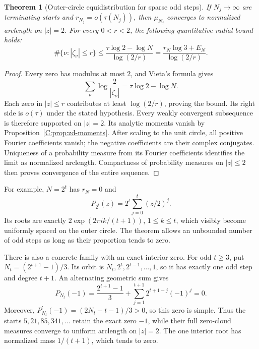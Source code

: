 \documentclass[11pt,a4paper]{article}
\newtheorem{theorem}{Theorem}[section]
\theoremstyle{definition}
\theoremstyle{remark}
\numberwithin{equation}{section}
\begin{document}
\begin{theorem}[Outer-circle equidistribution for sparse odd steps]
\label{C:thm:zd-outer-equidistribution}
If $N_j\to\infty$ are terminating starts and
$r_{N_j}=o(\tau(N_j))$, then $\mu_{N_j}$ converges to normalized
arclength on $|z|=2$.
For every $0<r<2$, the following quantitative radial bound holds:
\[
 \#\{\nu:|\zeta_\nu|\le r\}
 \le\frac{\tau\log2-\log N}{\log(2/r)}
 =\frac{r_N\log3+E_N}{\log(2/r)}.
\]
\end{theorem}
\begin{proof}
Every zero has modulus at most $2$, and Vieta's formula gives
\[
 \sum_\nu\log\frac2{|\zeta_\nu|}
 =\tau\log2-\log N.
\]
Each zero in $|z|\le r$ contributes at least $\log(2/r)$, proving
the bound. Its right side is $o(\tau)$ under the stated hypothesis.
Every weakly convergent subsequence is therefore supported on $|z|=2$.
Its analytic moments vanish by Proposition~\ref{C:prop:zd-moments}.
After scaling to the unit circle, all positive Fourier coefficients
vanish; the negative coefficients are their complex conjugates.
Uniqueness of a probability measure from its Fourier coefficients
identifies the limit as normalized arclength. Compactness of probability
measures on $|z|\le2$ then proves convergence of the entire sequence.
\end{proof}

For example, $N=2^t$ has $r_N=0$ and
\[
 P_{2^t}(z)=2^t\sum_{j=0}^t(z/2)^j.
\]
Its roots are exactly $2\exp(2\pi i k/(t+1))$, $1\le k\le t$,
which visibly become uniformly spaced on the outer circle. The theorem
allows an unbounded number of odd steps as long as their proportion
tends to zero.

There is also a concrete family with an exact interior zero. For odd
$t\ge3$, put $N_t=(2^{t+1}-1)/3$. Its orbit is
$N_t,2^t,2^{t-1},\ldots,1$, so it has exactly one odd step and degree
$t+1$. An alternating geometric sum gives
\[
 P_{N_t}(-1)=\frac{2^{t+1}-1}{3}
             +\sum_{j=1}^{t+1}2^{t+1-j}(-1)^j=0.
\]
Moreover, $P_{N_t}^{\prime}(-1)=(2N_t-t-1)/3>0$, so this zero is simple.
Thus the starts $5,21,85,341,\ldots$ retain the exact zero $-1$,
while their full zero-cloud measures converge to uniform arclength on
$|z|=2$. The one interior root has normalized mass $1/(t+1)$,
which tends to zero.
\end{document}
